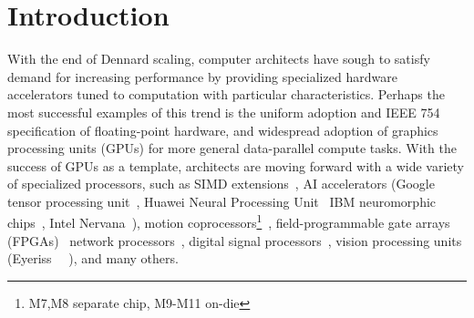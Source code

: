 
\chapter{Introduction}


With the end of Dennard scaling, computer architects have sough to satisfy demand for increasing performance by providing specialized hardware accelerators tuned to computation with particular characteristics.
Perhaps the most successful examples of this trend is the uniform adoption and IEEE 754 specification of floating-point hardware, and widespread adoption of graphics processing units (GPUs) for more general data-parallel compute tasks.
With the success of GPUs as a template, architects are moving forward with a wide variety of specialized processors, such as
SIMD extensions~\cite{intel2017avx, matz2013sse, arm2017neon},
AI accelerators (Google tensor processing unit~\cite{jouppi2017datacenter}, Huawei Neural Processing Unit~\cite{huawei2017kirin} IBM neuromorphic chips~\cite{merolla2014million}, Intel Nervana~\cite{intel2017nervana}),
motion coprocessors\footnote{M7,M8 separate chip, M9-M11 on-die}~,
field-programmable gate arrays (FPGAs)~
network processors~,
digital signal processors~,
vision processing units (Eyeriss~\cite{chen2017eyeriss} ~),
and many others.

